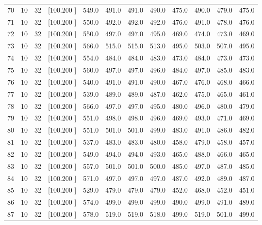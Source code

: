 \documentclass[12pt,a4paper]{article}
\begin{document}
\begin{center}
{\begin{tabular}{r r r r r r r r r r r r}
  70& 10& 32&[100.200   ]&   549.0&   491.0&   491.0&   490.0&   475.0&   490.0&   479.0&   475.0\\[-0.02in]
  71& 10& 32&[100.200   ]&   550.0&   492.0&   492.0&   492.0&   476.0&   491.0&   478.0&   476.0\\[-0.02in]
  72& 10& 32&[100.200   ]&   550.0&   497.0&   497.0&   495.0&   469.0&   474.0&   473.0&   469.0\\[-0.02in]
  73& 10& 32&[100.200   ]&   566.0&   515.0&   515.0&   513.0&   495.0&   503.0&   507.0&   495.0\\[-0.02in]
  74& 10& 32&[100.200   ]&   554.0&   484.0&   484.0&   483.0&   473.0&   484.0&   473.0&   473.0\\[-0.02in]
  75& 10& 32&[100.200   ]&   560.0&   497.0&   497.0&   496.0&   484.0&   497.0&   485.0&   483.0\\[-0.02in]
  76& 10& 32&[100.200   ]&   540.0&   491.0&   491.0&   490.0&   467.0&   476.0&   468.0&   466.0\\[-0.02in]
  77& 10& 32&[100.200   ]&   539.0&   489.0&   489.0&   487.0&   462.0&   475.0&   465.0&   461.0\\[-0.02in]
  78& 10& 32&[100.200   ]&   566.0&   497.0&   497.0&   495.0&   480.0&   496.0&   480.0&   479.0\\[-0.02in]
  79& 10& 32&[100.200   ]&   551.0&   498.0&   498.0&   496.0&   469.0&   493.0&   471.0&   469.0\\[-0.02in]
  80& 10& 32&[100.200   ]&   551.0&   501.0&   501.0&   499.0&   483.0&   491.0&   486.0&   482.0\\[-0.02in]
  81& 10& 32&[100.200   ]&   537.0&   483.0&   483.0&   480.0&   458.0&   479.0&   458.0&   457.0\\[-0.02in]
  82& 10& 32&[100.200   ]&   549.0&   494.0&   494.0&   493.0&   465.0&   488.0&   466.0&   465.0\\[-0.02in]
  83& 10& 32&[100.200   ]&   557.0&   501.0&   501.0&   500.0&   485.0&   497.0&   487.0&   485.0\\[-0.02in]
  84& 10& 32&[100.200   ]&   571.0&   497.0&   497.0&   497.0&   487.0&   492.0&   489.0&   487.0\\[-0.02in]
  85& 10& 32&[100.200   ]&   529.0&   479.0&   479.0&   479.0&   452.0&   468.0&   452.0&   451.0\\[-0.02in]
  86& 10& 32&[100.200   ]&   574.0&   499.0&   499.0&   499.0&   490.0&   499.0&   491.0&   489.0\\[-0.02in]
  87& 10& 32&[100.200   ]&   578.0&   519.0&   519.0&   518.0&   499.0&   519.0&   501.0&   499.0\\[-0.02in]

\end{tabular}}
\end{center}
\end{document}

